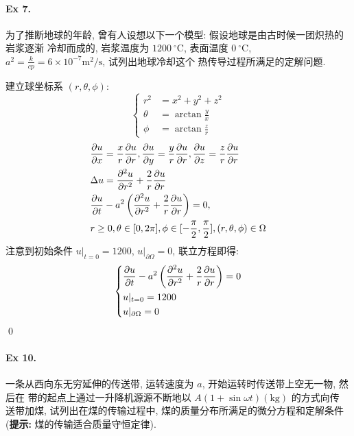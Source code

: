 \paragraph{Ex 7.}
为了推断地球的年龄, 曾有人设想以下一个模型: 假设地球是由古时候一团炽热的岩浆逐渐
冷却而成的, 岩浆温度为 $1200\ ^\circ \text{C}$, 表面温度 $0\ ^\circ \text{C}$,
$a^2 = \frac{k}{cp} = 6 \times 10^{-7} \text{m}^2/\text{s}$, 试列出地球冷却这个
热传导过程所满足的定解问题.

\begin{solution}
建立球坐标系 $(r, \theta, \phi)$:
\[ \left\{ \begin{aligned}
r^2 &= x^2 + y^2 + z^2 \\
\theta &= \arctan \frac{y}{x} \\
\phi &= \arctan \frac{z}{r}
\end{aligned} \right. \]
\begin{align*}
&{\frac{\partial {u}}{\partial {x}}} = \frac{x}{r} {\frac{\partial {u}}{\partial {r}}}, 
{\frac{\partial {u}}{\partial {y}}} = \frac{y}{r} {\frac{\partial {u}}{\partial {r}}}, 
{\frac{\partial {u}}{\partial {z}}} = \frac{z}{r} {\frac{\partial {u}}{\partial {r}}} \\
& \Delta u = {\frac{\partial {^2u}}{\partial {r^2}}}
  + \frac{2}{r} {\frac{\partial {u}}{\partial {r}}} \\
& {\frac{\partial {u}}{\partial {t}}} - a^2 \left(
  {\frac{\partial {^2u}}{\partial {r^2}}} + \frac{2}{r} {\frac{\partial {u}}{\partial {r}}}
  \right) = 0, \\
& r \geq 0, \theta \in [0, 2\pi],
  \phi \in [-\frac{\pi}{2}, \frac{\pi}{2}], (r, \theta, \phi) \in \Omega
\end{align*}
注意到初始条件 $u|_{t=0} = 1200$, $u|_{\partial \Omega} = 0$, 联立方程即得:
\[ \left\{ \begin{aligned} 
&{\frac{\partial {u}}{\partial {t}}} - a^2 \left(
    {\frac{\partial {^2u}}{\partial {r^2}}} + \frac{2}{r} {\frac{\partial {u}}{\partial {r}}}
    \right) = 0 \\
&u|_{t=0} = 1200 \\
&u|_{\partial \Omega} = 0
\end{aligned} \right. \]
\qed
\end{solution}
\paragraph{Ex 10.}
一条从西向东无穷延伸的传送带, 运转速度为 $a$, 开始运转时传送带上空无一物, 然后在
带的起点上通过一升降机源源不断地以 $A (1 + \sin \omega t)(\text{kg})$ 的方式向传
送带加煤, 试列出在煤的传输过程中, 煤的质量分布所满足的微分方程和定解条件
({\bf 提示:} 煤的传输适合质量守恒定律).

